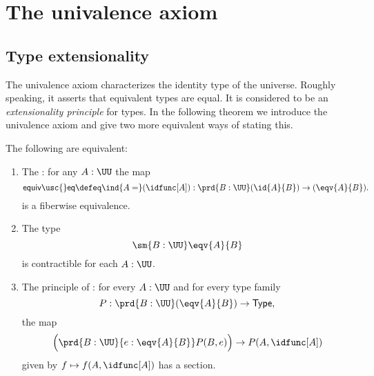 \chapter{The univalence axiom}

\section{Type extensionality}

The univalence axiom characterizes the identity type of the universe. Roughly speaking, it asserts that equivalent types are equal. It is considered to be an \emph{extensionality principle} for types. In the following theorem we introduce the univalence axiom and give two more equivalent ways of stating this.

\begin{thm}\label{thm:univalence}
The following are equivalent:
\begin{enumerate}
\item The : for any $A:\UU$ the map
\begin{equation*}
\mathsf{equiv\usc{}eq}\defeq \ind{A=}(\idfunc[A]) : \prd{B:\UU} (\id{A}{B})\to(\eqv{A}{B}).
\end{equation*}
is a fiberwise equivalence.
\item The type
\begin{equation*}
\sm{B:\UU}\eqv{A}{B}
\end{equation*}
is contractible for each $A:\UU$.
\item The principle of : for every $A:\UU$ and for every type family
\begin{equation*}
P:\prd{B:\UU} (\eqv{A}{B})\to \mathsf{Type},
\end{equation*}
the map
\begin{equation*}
\Big(\prd{B:\UU}{e:\eqv{A}{B}}P(B,e)\Big)\to P(A,\idfunc[A])
\end{equation*}
given by $f\mapsto f(A,\idfunc[A])$ has a section.
\end{enumerate}
\end{thm}

